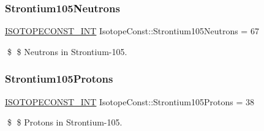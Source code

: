 \subsubsection{\texorpdfstring{Strontium105\+Neutrons}{Strontium105Neutrons}}
{\footnotesize\ttfamily \mbox{\hyperlink{group___isotope_const-_macros_ga5f18360b3e99483a35c32d789e62621c}{I\+S\+O\+T\+O\+P\+E\+C\+O\+N\+S\+T\+\_\+\+I\+NT}} Isotope\+Const\+::\+Strontium105\+Neutrons = 67}

\$ \$ Neutrons in Strontium-\/105. \mbox{\label{group___isotope_const-_strontium-_sr105_ga02f85ef0ba5a1dfc778c4b902b845343}} 
\subsubsection{\texorpdfstring{Strontium105\+Protons}{Strontium105Protons}}
{\footnotesize\ttfamily \mbox{\hyperlink{group___isotope_const-_macros_ga5f18360b3e99483a35c32d789e62621c}{I\+S\+O\+T\+O\+P\+E\+C\+O\+N\+S\+T\+\_\+\+I\+NT}} Isotope\+Const\+::\+Strontium105\+Protons = 38}

\$ \$ Protons in Strontium-\/105. 